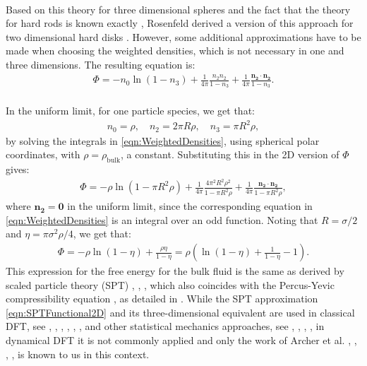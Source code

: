 \documentclass[11pt, a4paper]{article}
\theoremstyle{definition}
\begin{document}
\\
Based on this theory for three dimensional spheres and the fact that the theory for hard rods is known exactly \cite{Percus1976}, Rosenfeld derived a version of this approach for two dimensional hard disks \cite{Rosenfeld2DInterp}. However, some additional approximations have to be made when choosing the weighted densities, which is not necessary in one and three dimensions. The resulting equation is:
\begin{align*}
	\Phi = - n_0 \ln(1-n_3) + \frac{1}{4 \pi} \frac{n_2 n_2}{1-n_3} + \frac{1}{4 \pi} \frac{\mathbf{n_2} \cdot \mathbf{n_2}}{1-n_3}.
\end{align*}
\\
In the uniform limit, for one particle species, we get that:
\begin{align*}
	n_0 = \rho, \quad n_2 = 2 \pi R \rho, \quad n_3 = \pi R^2 \rho,
\end{align*}
by solving the integrals in \eqref{eqn:WeightedDensities}, using spherical polar coordinates, with $\rho = \rho_{\text{bulk}}$, a constant. 
Substituting this in the 2D version of $\Phi$ gives:
\begin{align*}
	\Phi = - \rho \ln (1- \pi R^2 \rho) + \frac{1}{4 \pi} \frac{4\pi^2 R^2 \rho^2}{1 - \pi R^2 \rho} + \frac{1}{4 \pi}\frac{\mathbf{n_2} \cdot \mathbf{n_2}}{1 - \pi R^2 \rho},
\end{align*}
where $\mathbf{n_2} = \mathbf 0$ in the uniform limit, since the corresponding equation in \eqref{eqn:WeightedDensities} is an integral over an odd function.
Noting that $R = \sigma/2$ and $\eta = \pi \sigma^2 \rho /4$, we get that:
\begin{align} \label{eqn:SPTFunctional2D}
	\Phi = - \rho \ln (1- \eta) + \frac{\rho \eta}{1 - \eta} = \rho \left(\ln(1-\eta) + \frac{1}{1- \eta} -1 \right).
\end{align} 
This expression for the free energy for the bulk fluid is the same as derived by scaled particle theory (SPT) \cite{Reiss1959}, \cite{Reiss1960}, \cite{Helfand1961}, which also coincides with the Percus-Yevic compressibility equation \cite{PercusYevick1}, as detailed in \cite{RosenfeldSPT}.
While the SPT approximation \eqref{eqn:SPTFunctional2D} and its three-dimensional equivalent are used in classical DFT, see \cite{DFTWinkelmann2001}, \cite{DFTRoth1}, \cite{DFTRoth2}, \cite{DFTGonzalez1997}, \cite{DFTCuesta2008}, \cite{DFTLoewen2002}, and other statistical mechanics approaches, see \cite{GrafLoewen1999}, \cite{DuBois2002}, \cite{Chamoux1998}, \cite{Chamoux1996}, in dynamical DFT it is not commonly applied and only the work of Archer et al. \cite{ArcherSed1}, \cite{ArcherSed2008}, \cite{ArcherSed2011}, \cite{ArcherSed2013}, is known to us in this context.
\end{document}
